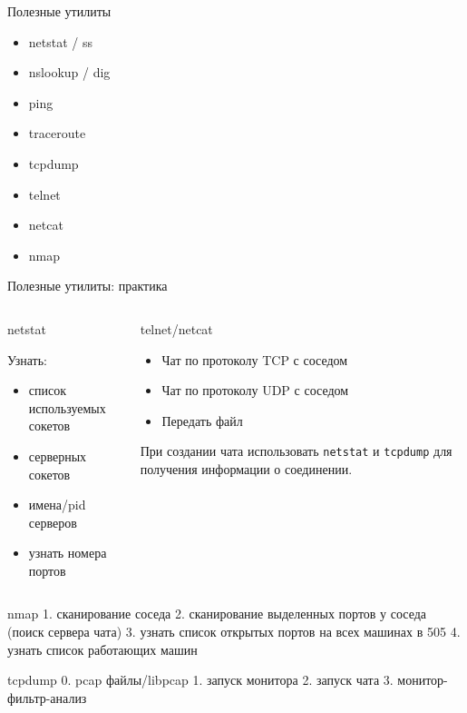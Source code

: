 \begin{frame}{Полезные утилиты}
	\begin{center}
		\begin{itemize}
			\item netstat / ss
			\item nslookup / dig
			\item ping
			\item traceroute
			\item tcpdump
			\item telnet
			\item netcat
			\item nmap
		\end{itemize}
	\end{center}

\end{frame}


\begin{frame}{Полезные утилиты: практика}

	\begin{columns}
		\begin{block}{netstat}

			Узнать:
			\begin{itemize}
				\item список используемых сокетов
				\item серверных сокетов
				\item имена/pid серверов
				\item узнать номера портов
			\end{itemize}
		\end{block}
	
		\pause
		\begin{block}{telnet/netcat}

			\begin{itemize}
				\item Чат по протоколу TCP с соседом
				\item Чат по протоколу UDP с соседом
				\item Передать файл
			\end{itemize}
	
			При создании чата использовать {\tt netstat} и {\tt tcpdump}
			для получения информации о соединении.
		\end{block}
	
	\end{columns}
\end{frame}

nmap
1. сканирование соседа
2. сканирование выделенных портов у соседа (поиск сервера чата) 
3. узнать список открытых портов на всех машинах в 505
4. узнать список  работающих машин

tcpdump
0. pcap файлы/libpcap
1. запуск монитора
2. запуск чата
3. монитор-фильтр-анализ


